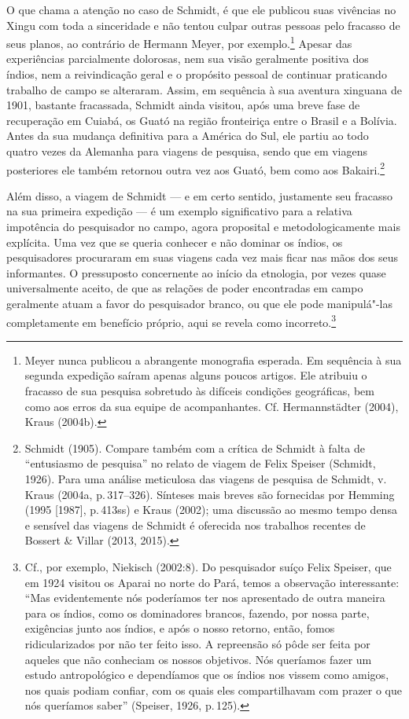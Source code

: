 O que chama a atenção no caso de Schmidt, é que ele publicou suas
vivências no Xingu com toda a sinceridade e não tentou culpar outras
pessoas pelo fracasso de seus planos, ao contrário de Hermann Meyer, por
exemplo.\footnote{Meyer nunca publicou a abrangente monografia esperada.
  Em sequência à sua segunda expedição saíram apenas alguns poucos
  artigos. Ele atribuiu o fracasso de sua pesquisa sobretudo às
  difíceis condições geográficas, bem como aos erros da sua equipe de
  acompanhantes. Cf. Hermannstädter (2004), Kraus (2004b).} Apesar das
experiências parcialmente dolorosas, nem sua visão geralmente positiva
dos índios, nem a reivindicação geral e o propósito pessoal de
continuar praticando trabalho de campo se alteraram. Assim, em
sequência à sua aventura xinguana de 1901, bastante fracassada, Schmidt
ainda visitou, após uma breve fase de recuperação em Cuiabá, os Guató na
região fronteiriça entre o Brasil e a Bolívia. Antes da sua mudança
definitiva para a América do Sul, ele partiu ao todo quatro vezes da
Alemanha para viagens de pesquisa, sendo que em viagens posteriores ele
também retornou outra vez aos Guató, bem como aos Bakairi.\footnote{Schmidt
  (1905). Compare também com a crítica de Schmidt à falta de
  ``entusiasmo de pesquisa'' no relato de viagem de Felix Speiser
  (Schmidt, 1926). Para uma análise meticulosa das viagens de pesquisa
  de Schmidt, v. Kraus (2004a, p.\,317--326). Sínteses mais breves são
  fornecidas por Hemming (1995 {[}1987{]}, p.\,413ss) e Kraus (2002); uma
  discussão ao mesmo tempo densa e sensível das viagens de Schmidt é
  oferecida nos trabalhos recentes de Bossert \& Villar (2013, 2015).}

Além disso, a viagem de Schmidt --- e em certo sentido, justamente seu
fracasso na sua primeira expedição --- é um exemplo significativo para a
relativa impotência do pesquisador no campo, agora proposital e
metodologicamente mais explícita. Uma vez que se queria conhecer e não
dominar os índios, os pesquisadores procuraram em suas viagens cada vez
mais ficar nas mãos dos seus informantes. O pressuposto concernente ao
início da etnologia, por vezes quase universalmente aceito, de que as
relações de poder encontradas em campo geralmente atuam a favor do
pesquisador branco, ou que ele pode manipulá"-las completamente em
benefício próprio, aqui se revela como incorreto.\footnote{Cf., por
  exemplo, Niekisch (2002:8). Do pesquisador suíço Felix Speiser, que em
  1924 visitou os Aparai no norte do Pará, temos a observação
  interessante: ``Mas evidentemente nós poderíamos ter nos apresentado
  de outra maneira para os índios, como os dominadores brancos, fazendo,
  por nossa parte, exigências junto aos índios, e após o nosso retorno,
  então, fomos ridicularizados por não ter feito isso. A repreensão só
  pôde ser feita por aqueles que não conheciam os nossos objetivos. Nós
  queríamos fazer um estudo antropológico e dependíamos que os índios
  nos vissem como amigos, nos quais podiam confiar, com os quais eles
  compartilhavam com prazer o que nós queríamos saber'' (Speiser, 1926,
  p.\,125).}

